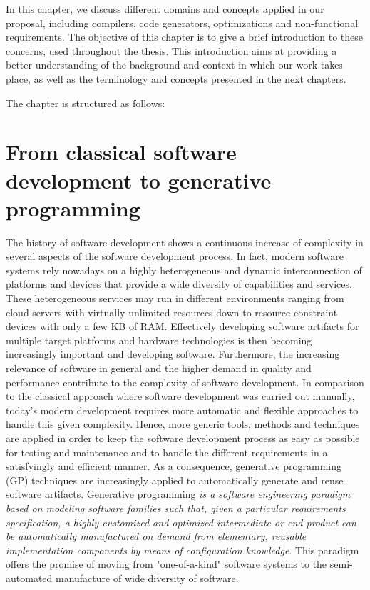  
In this chapter, we discuss different domains and concepts applied in our proposal, including compilers, code generators, optimizations and non-functional requirements.
The objective of this chapter is to give a brief introduction to these concerns, used throughout the thesis. This introduction aims at providing a better understanding of the background and context in which our work takes place, as well as the terminology and concepts presented in the next chapters.

The chapter is structured as follows:
\section{From classical software development to generative programming}
The history of software development shows a continuous increase of complexity in several aspects of the software development process\cite{betz2011improving}. 
In fact, modern software systems rely nowadays on a highly heterogeneous and dynamic interconnection of platforms and devices that provide a wide diversity of capabilities and services. These heterogeneous services may run in different environments ranging from cloud servers with virtually unlimited resources down to resource-constraint devices with only a few KB of RAM. Effectively developing software artifacts for multiple target platforms and hardware technologies is then becoming increasingly important and developing software. 
Furthermore, the increasing relevance of software in general and the higher demand in quality and performance contribute to the complexity of software development. In comparison to the classical approach where software development was carried out manually, today’s modern development requires more automatic and flexible approaches to handle this given complexity.
Hence, more generic tools, methods and techniques are applied in order to keep the software development process as easy as possible for testing and maintenance and to handle the different requirements in a satisfyingly and efficient manner.
As a consequence, generative programming (GP) techniques are increasingly applied to automatically generate and reuse software artifacts.
Generative programming \textit{is a software engineering paradigm based on modeling software families such that, given a particular requirements specification, a highly customized and optimized intermediate or end-product can be automatically manufactured on demand from elementary, reusable implementation components by means of configuration knowledge}\cite{Czarnecki:2000:GPM:345203}. 
This paradigm offers the promise of moving from "one-of-a-kind" software systems to the semi-automated manufacture of wide diversity of software.

